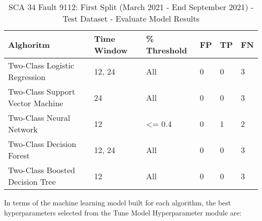 \begin{table}[!ht]
    \centering
    \begin{tabular}{|l|l|l|l|l|l|}
    \hline
        Alghoritm & Time Window & \% Threshold & FP & TP & FN \\ \hline
        Two-Class Logistic Regression & 12, 24 & All & 0 & 0 & 3 \\ \hline
        Two-Class Support Vector Machine & 24 & All & 0 & 0 & 3 \\ \hline
        Two-Class Neural Network & 12 & <= 0.4 & 0 & 1 & 2 \\ \hline
        Two-Class Decision Forest & 12, 24 & All & 0 & 0 & 3 \\ \hline
        Two-Class Boosted Decision Tree & 12 & All & 0 & 0 & 3 \\ \hline
    \end{tabular}
    \caption{SCA 34 Fault 9112: First Split (March 2021 - End September 2021) - Test Dataset - Evaluate Model Results}
    \label{9112_SCA34_1st}
\end{table}

In terms of the machine learning model built for each algorithm, the best hyperparameters selected from the Tune Model Hyperparameter module are:


